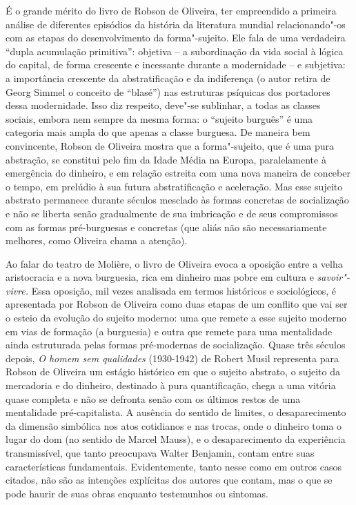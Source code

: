 É o grande mérito do livro de Robson de Oliveira, ter empreendido a
primeira análise de diferentes episódios da história da literatura
mundial relacionando"-os com as etapas do desenvolvimento da
forma"-sujeito. Ele fala de uma verdadeira ``dupla acumulação
primitiva'': objetiva -- a subordinação da vida social à lógica do
capital, de forma crescente e incessante durante a modernidade -- e
subjetiva: a importância crescente da abstratificação e da indiferença
(o autor retira de Georg Simmel o conceito de ``blasé'') nas estruturas
psíquicas dos portadores dessa modernidade. Isso diz respeito, deve"-se
sublinhar, a todas as classes sociais, embora nem sempre da mesma forma:
o ``sujeito burguês'' é uma categoria mais ampla do que apenas a classe
burguesa. De maneira bem convincente, Robson de Oliveira mostra que a forma"-sujeito,
que é uma pura abstração, se constitui pelo fim da Idade Média na
Europa, paralelamente à emergência do dinheiro, e em relação estreita
com uma nova maneira de conceber o tempo, em prelúdio à sua futura
abstratificação e aceleração. Mas esse sujeito abstrato permanece
durante séculos mesclado às formas concretas de socialização e não se
liberta senão gradualmente de sua imbricação e de seus compromissos com
as formas pré-burguesas e concretas (que aliás não são necessariamente
melhores, como Oliveira chama a atenção).

Ao falar do teatro de Molière, o livro de Oliveira evoca a oposição
entre a velha aristocracia e a nova burguesia, rica em dinheiro mas
pobre em cultura e \emph{savoir"-vivre.} Essa oposição, mil vezes
analisada em termos históricos e sociológicos, é apresentada por Robson
de Oliveira como duas etapas de um conflito que vai ser o esteio da
evolução do sujeito moderno: uma que remete a esse sujeito moderno em
vias de formação (a burguesia) e outra que remete para uma mentalidade
ainda estruturada pelas formas pré-modernas de socialização. Quase três
séculos depois, \emph{O homem sem qualidades} (1930-1942) de Robert
Musil representa para Robson de Oliveira um estágio histórico em que o
sujeito abstrato, o sujeito da mercadoria e do dinheiro, destinado à
pura quantificação, chega a uma vitória quase completa e não se defronta
senão com os últimos restos de uma mentalidade pré-capitalista. A
ausência do sentido de limites, o desaparecimento da dimensão simbólica
nos atos cotidianos e nas trocas, onde o dinheiro toma o lugar do dom (no
sentido de Marcel Mauss), e o desaparecimento da experiência
transmissível, que tanto preocupava Walter Benjamin, contam entre suas
características fundamentais. Evidentemente, tanto nesse como em outros
casos citados, não são as intenções explícitas dos autores que contam,
mas o que se pode haurir de suas obras enquanto testemunhos ou
sintomas.

